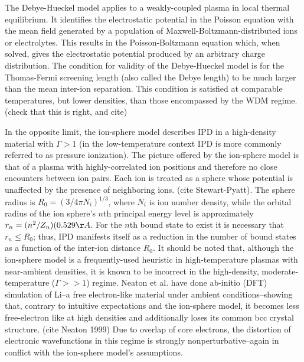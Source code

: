 \documentclass [11pt, proquest, article] {uwthesis}[2016/11/22]
\begin{document}
The Debye-Hueckel model applies to a weakly-coupled plasma in local thermal equilibrium. It identifies the electrostatic potential in the Poisson equation with the mean field generated by a population of Maxwell-Boltzmann-distributed ions or electrolytes. This results in the Poisson-Boltzmann equation which, when solved, gives the electrostatic potential produced by an arbitrary charge distribution. The condition for validity of the Debye-Hueckel model is for the Thomas-Fermi screening length (also called the Debye length) to be much larger than the mean inter-ion separation. This condition is satisfied at comparable temperatures, but lower densities, than those encompassed by the WDM regime. (check that this is right, and cite)

In the opposite limit, the ion-sphere model describes IPD in a high-density material with $\Gamma > 1$ (in the low-temperature context IPD is more commonly referred to as pressure ionization). The picture offered by the ion-sphere model is that of a plasma with highly-correlated ion positions and therefore no close encounters between ion pairs. Each ion is treated as a sphere whose potential is unaffected by the presence of neighboring ions. (cite Stewart-Pyatt). The sphere radius is $R_0 = (3/4 \pi N_i)^{1/3}$, where $N_i$ is ion number density, while the orbital radius of the ion sphere's $n$th principal energy level is approximately $r_n = (n^2/Z_n)(0.529 \AA$. For the $n$th bound state to exist it is necessary that $r_n \leq R_0$; thus, IPD manifests itself as a reduction in the number of bound states as a function of the inter-ion distance $R_0$. It should be noted that, although the ion-sphere model is a frequently-used heuristic in high-temperature plasmas with near-ambient densities, it is known to be incorrect in the high-density, moderate-temperature ($\Gamma >> 1$) regime. Neaton et al. have done ab-initio (DFT) simulation of Li--a free electron-like material under ambient conditions--showing that, contrary to intuitive expectations and the ion-sphere model, it becomes less free-electron like at high densities and additionally loses its common bcc crystal structure. (cite Neaton 1999) Due to overlap of core electrons, the distortion of electronic wavefunctions in this regime is strongly nonperturbative--again in conflict with the ion-sphere model's assumptions. 
\end{document}
